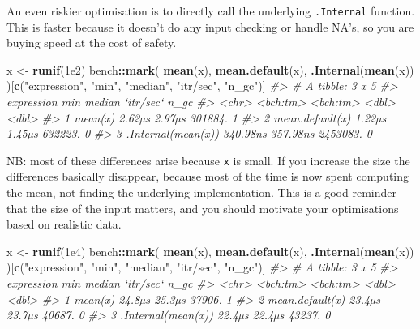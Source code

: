 \documentclass[]{book}
\newenvironment{Shaded}{\begin{snugshade}}{\end{snugshade}}
\newcommand{\CommentTok}[1]{\textcolor[rgb]{0.37,0.37,0.37}{\textit{#1}}}
\newcommand{\FloatTok}[1]{\textcolor[rgb]{0.06,0.06,0.06}{#1}}
\newcommand{\KeywordTok}[1]{\textcolor[rgb]{0.27,0.27,0.27}{\textbf{#1}}}
\newcommand{\NormalTok}[1]{#1}
\newcommand{\OperatorTok}[1]{\textcolor[rgb]{0.43,0.43,0.43}{\textbf{#1}}}
\newcommand{\StringTok}[1]{\textcolor[rgb]{0.5,0.5,0.5}{#1}}
\begin{document}
An even riskier optimisation is to directly call the underlying \texttt{.Internal} function. This is faster because it doesn't do any input checking or handle NA's, so you are buying speed at the cost of safety.

\begin{Shaded}
\begin{Highlighting}[]
\NormalTok{x <-}\StringTok{ }\KeywordTok{runif}\NormalTok{(}\FloatTok{1e2}\NormalTok{)}
\NormalTok{bench}\OperatorTok{::}\KeywordTok{mark}\NormalTok{(}
  \KeywordTok{mean}\NormalTok{(x),}
  \KeywordTok{mean.default}\NormalTok{(x),}
  \KeywordTok{.Internal}\NormalTok{(}\KeywordTok{mean}\NormalTok{(x))}
\NormalTok{)[}\KeywordTok{c}\NormalTok{(}\StringTok{"expression"}\NormalTok{, }\StringTok{"min"}\NormalTok{, }\StringTok{"median"}\NormalTok{, }\StringTok{"itr/sec"}\NormalTok{, }\StringTok{"n_gc"}\NormalTok{)]}
\CommentTok{#> # A tibble: 3 x 5}
\CommentTok{#>   expression              min   median `itr/sec`  n_gc}
\CommentTok{#>   <chr>              <bch:tm> <bch:tm>     <dbl> <dbl>}
\CommentTok{#> 1 mean(x)              2.62µs   2.97µs   301884.     1}
\CommentTok{#> 2 mean.default(x)      1.22µs   1.45µs   632223.     0}
\CommentTok{#> 3 .Internal(mean(x)) 340.98ns 357.98ns  2453083.     0}
\end{Highlighting}
\end{Shaded}

NB: most of these differences arise because \texttt{x} is small. If you increase the size the differences basically disappear, because most of the time is now spent computing the mean, not finding the underlying implementation. This is a good reminder that the size of the input matters, and you should motivate your optimisations based on realistic data.

\begin{Shaded}
\begin{Highlighting}[]
\NormalTok{x <-}\StringTok{ }\KeywordTok{runif}\NormalTok{(}\FloatTok{1e4}\NormalTok{)}
\NormalTok{bench}\OperatorTok{::}\KeywordTok{mark}\NormalTok{(}
  \KeywordTok{mean}\NormalTok{(x),}
  \KeywordTok{mean.default}\NormalTok{(x),}
  \KeywordTok{.Internal}\NormalTok{(}\KeywordTok{mean}\NormalTok{(x))}
\NormalTok{)[}\KeywordTok{c}\NormalTok{(}\StringTok{"expression"}\NormalTok{, }\StringTok{"min"}\NormalTok{, }\StringTok{"median"}\NormalTok{, }\StringTok{"itr/sec"}\NormalTok{, }\StringTok{"n_gc"}\NormalTok{)]}
\CommentTok{#> # A tibble: 3 x 5}
\CommentTok{#>   expression              min   median `itr/sec`  n_gc}
\CommentTok{#>   <chr>              <bch:tm> <bch:tm>     <dbl> <dbl>}
\CommentTok{#> 1 mean(x)              24.8µs   25.3µs    37906.     1}
\CommentTok{#> 2 mean.default(x)      23.4µs   23.7µs    40687.     0}
\CommentTok{#> 3 .Internal(mean(x))   22.4µs   22.4µs    43237.     0}
\end{Highlighting}
\end{Shaded}
\end{document}
